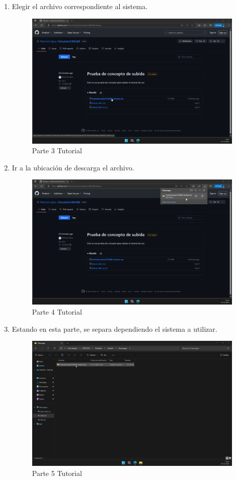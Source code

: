 \begin{enumerate}[label=\arabic*.-]
    \item Elegir el archivo correspondiente al sistema.
\begin{figure}[ht]
    \centering
    \includegraphics[width=10.5cm]{figures/TutorialWindows/tutorial (3).png}
    \caption{Parte 3 Tutorial}
    \label{fig:tuto3}
\end{figure}

\clearpage
    \item Ir a la ubicación de descarga el archivo.
\begin{figure}[ht]
    \centering
    \includegraphics[width=10.5cm]{figures/TutorialWindows/tutorial (4).png}
    \caption{Parte 4 Tutorial}
    \label{fig:tuto4}
\end{figure}

    \item Estando en esta parte, se separa dependiendo el sistema a utilizar.
\begin{figure}[ht]
    \centering
    \includegraphics[width=10.5cm]{figures/TutorialWindows/tutorial (5).png}
    \caption{Parte 5 Tutorial}
    \label{fig:tuto5}
\end{figure}
\end{enumerate}
\clearpage

